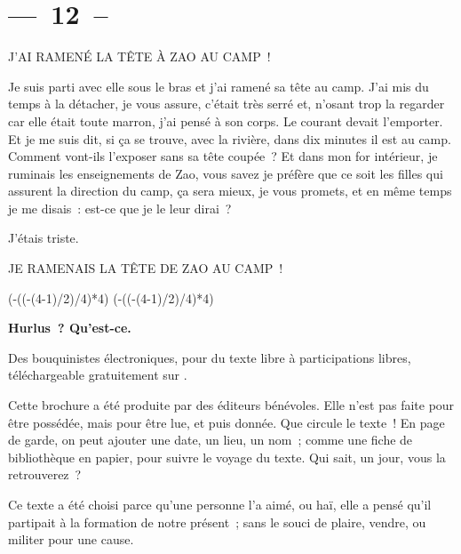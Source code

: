 \documentclass[french,twoside]{book} %
\newcommand{\dateline}[1]{\medskip{\RaggedLeft{#1}\par}\bigskip}
\def\truncdiv#1#2{((#1-(#2-1)/2)/#2)}
\def\moduloop#1#2{(#1-\truncdiv{#1}{#2}*#2)}
\def\modulo#1#2{\number\numexpr\moduloop{#1}{#2}\relax}
\begin{document}
\section[{— 12 –}]{— 12 –}\renewcommand{\leftmark}{— 12 –}

J’AI RAMENÉ LA TÊTE À ZAO AU CAMP !\par
\bigbreak
\noindent Je suis parti avec elle sous le bras et j’ai ramené sa tête au camp. J’ai mis du temps à la détacher, je vous assure, c’était très serré et, n’osant trop la regarder car elle était toute marron, j’ai pensé à son corps. Le courant devait l’emporter. Et je me suis dit, si ça se trouve, avec la rivière, dans dix minutes il est au camp. Comment vont-ils l’exposer sans sa tête coupée ? Et dans mon for intérieur, je ruminais les enseignements de Zao, vous savez je préfère que ce soit les filles qui assurent la direction du camp, ça sera mieux, je vous promets, et en même temps je me disais : est-ce que je le leur dirai ?\par
J’étais triste.\par
\bigbreak
JE RAMENAIS LA TÊTE DE ZAO AU CAMP !\par

\dateline{Lille, octobre 2016}
 


\ifbooklet
  \pagestyle{empty}
  \clearpage
  \ifnum\modulo{\value{page}}{4}=0 \hbox{}\newpage\hbox{}\newpage\fi
  \ifnum\modulo{\value{page}}{4}=1 \hbox{}\newpage\hbox{}\newpage\fi


  \hbox{}\newpage
  \ifodd\value{page}\hbox{}\newpage\fi
  {\centering\color{rubric}\bfseries\noindent\large
    Hurlus ? Qu’est-ce.\par
    \bigskip
  }
  \noindent Des bouquinistes électroniques, pour du texte libre à participations libres,
  téléchargeable gratuitement sur \href{https://hurlus.fr}{}.\par
  \bigskip
  \noindent Cette brochure a été produite par des éditeurs bénévoles.
  Elle n’est pas faite pour être possédée, mais pour être lue, et puis donnée.
  Que circule le texte !
  En page de garde, on peut ajouter une date, un lieu, un nom ;
  comme une fiche de bibliothèque en papier,
  pour suivre le voyage du texte. Qui sait, un jour, vous la retrouverez ?
  \par

  Ce texte a été choisi parce qu’une personne l’a aimé,
  ou haï, elle a pensé qu’il partipait à la formation de notre présent ;
  sans le souci de plaire, vendre, ou militer pour une cause.
  \par
\end{document}

